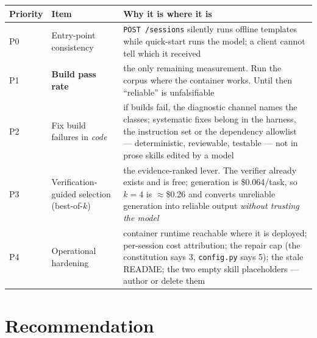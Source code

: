 \documentclass[11pt,a4paper]{article}
\begin{document}
\begin{center}
\begin{tabular}{@{}p{}p{}p{}@{}}
\toprule
\textbf{Priority} & \textbf{Item} & \textbf{Why it is where it is} \\
\midrule
P0 & Entry-point consistency & \texttt{POST /sessions} silently runs offline
templates while quick-start runs the model; a client cannot tell which it received \\
P1 & \textbf{Build pass rate} & the only remaining measurement. Run the corpus where
the container works. Until then ``reliable'' is unfalsifiable \\
P2 & Fix build failures in \emph{code} & if builds fail, the diagnostic channel names
the classes; systematic fixes belong in the harness, the instruction set or the
dependency allowlist --- deterministic, reviewable, testable --- not in prose skills
edited by a model \\
P3 & Verification-guided selection (best-of-$k$) & the evidence-ranked lever. The
verifier already exists and is free; generation is \$0.064/task, so $k{=}4$ is
$\approx$\$0.26 and converts unreliable generation into reliable output \emph{without
trusting the model} \\
P4 & Operational hardening & container runtime reachable where it is deployed;
per-session cost attribution; the repair cap (the constitution says 3,
\texttt{config.py} says 5); the stale README; the two empty skill placeholders ---
author or delete them \\
\bottomrule
\end{tabular}
\end{center}

\section{Recommendation}
\end{document}

